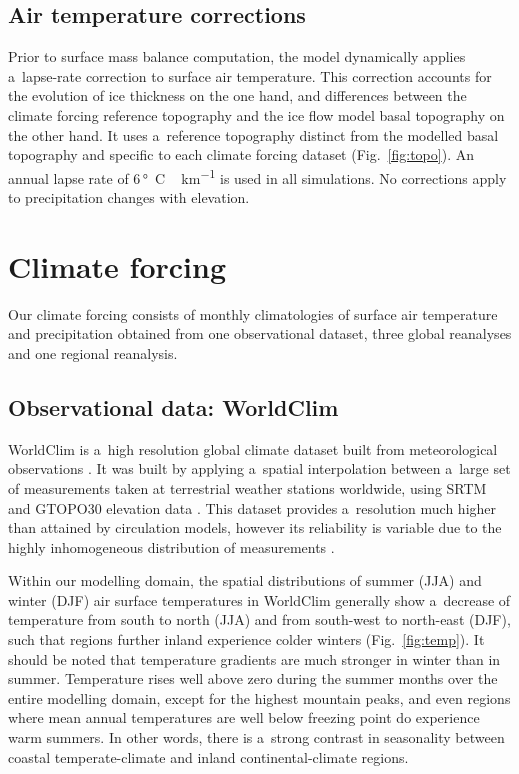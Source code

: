 \documentclass[tc, ms]{copernicus}
\begin{document}
\subsection{Air temperature corrections}

Prior to surface mass balance computation, the model dynamically applies a~lapse-rate correction to surface air temperature. This correction accounts for the evolution of ice thickness on the one hand, and differences between the climate forcing reference topography and the ice flow model basal topography on the other hand. It uses a~reference topography distinct from the modelled basal topography and specific to each climate forcing dataset (Fig.~\ref{fig:topo}). An annual lapse rate of 6\,\unit{\degree C\,km^{-1}} is used in all simulations. No corrections apply to precipitation changes with elevation.

\section{Climate forcing}
\label{sec:climate}

Our climate forcing consists of monthly climatologies of surface air temperature and precipitation obtained from one observational dataset, three global reanalyses and one regional reanalysis.

\subsection{Observational data: WorldClim}

WorldClim is a~high resolution global climate dataset built from meteorological observations \citep{data:worldclim}. It was built by applying a~spatial interpolation between a~large set of measurements taken at terrestrial weather stations worldwide, using SRTM \citep{data:srtm} and GTOPO30 elevation data \citep{data:gtopo30}. This dataset provides a~resolution much higher than attained by circulation models, however its reliability is variable due to the highly inhomogeneous distribution of measurements \citep{data:worldclim}.

Within our modelling domain, the spatial distributions of summer (JJA) and winter (DJF) air surface temperatures in WorldClim generally show a~decrease of temperature from south to north (JJA) and from south-west to north-east (DJF), such that regions further inland experience colder winters (Fig.~\ref{fig:temp}). It should be noted that temperature gradients are much stronger in winter than in summer. Temperature rises well above zero during the summer months over the entire modelling domain, except for the highest mountain peaks, and even regions where mean annual temperatures are well below freezing point do experience warm summers. In other words, there is a~strong contrast in seasonality between coastal temperate-climate and inland continental-climate regions.
\end{document}
